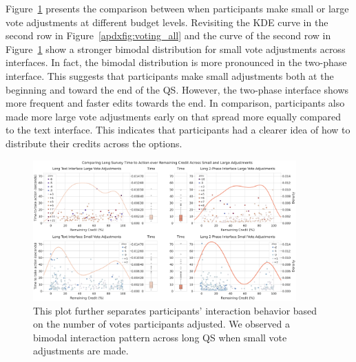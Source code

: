 Figure~\ref{apdxfig:voting_v3_v4} presents the comparison between when participants make small or large vote adjustments at different budget levels. Revisiting the KDE curve in the second row in Figure~\ref{apdxfig:voting_all} and the curve of the second row in Figure~\ref{apdxfig:voting_v3_v4} show a stronger bimodal distribution for small vote adjustments across interfaces. In fact, the bimodal distribution is more pronounced in the two-phase interface. This suggests that participants make small adjustments both at the beginning and toward the end of the QS. However, the two-phase interface shows more frequent and faster edits towards the end. In comparison, participants also made more large vote adjustments early on that spread more equally compared to the text interface. This indicates that participants had a clearer idea of how to distribute their credits across the options.

\begin{figure}[p]
    \centering
    \includegraphics[width=0.9\textwidth]{content/image/results/combined_density_plots.pdf}
    \caption{This plot further separates participants' interaction behavior based on the number of votes participants adjusted. We observed a bimodal interaction pattern across long QS when small vote adjustments are made.}
    \label{apdxfig:voting_v3_v4}
\end{figure}


